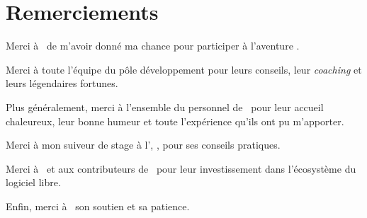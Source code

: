 \section*{Remerciements}

Merci à \ahugon\ de m'avoir donné ma chance pour participer à l'aventure \asl.

Merci à toute l'équipe du pôle développement pour leurs conseils, leur \textit{coaching} et leurs légendaires fortunes.

Plus généralement, merci à l'ensemble du personnel de \asensio\ pour leur accueil chaleureux, leur bonne humeur et toute l'expérience qu'ils ont pu m'apporter.

Merci à mon suiveur de stage à l'\autc, \asuiveur, pour ses conseils pratiques.

Merci à \apotencier\ et aux contributeurs de \asf\ pour leur investissement dans l'écosystème du logiciel libre.

Enfin, merci à \asarah\ son soutien et sa patience.
